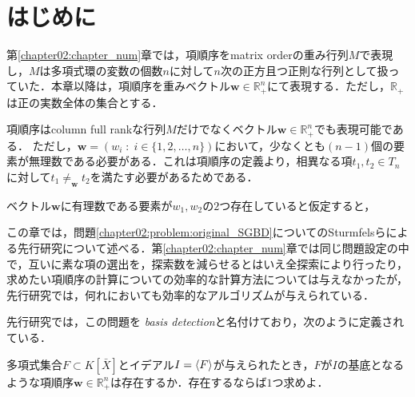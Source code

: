 \section{はじめに}
第\ref{chapter02:chapter_num}章では，項順序をmatrix orderの重み行列$M$で表現し，$M$は多項式環の変数の個数$n$に対して$n$次の正方且つ正則な行列として扱っていた．本章以降は，項順序を重みベクトル$\bm{w}\in \mathbb{R}^n_{+}$にて表現する．ただし，$\mathbb{R}_{+}$は正の実数全体の集合とする．
\begin{remark*}[ベクトルで表現された項順序について]
	項順序はcolumn full rankな行列$M$だけでなくベクトル$\bm{w}\in \mathbb{R}^n_{+}$でも表現可能である．
	ただし，$\bm{w} = (w_i\;:\; i\in \{1, 2, \dots, n\})$において，少なくとも$(n-1)$個の要素が無理数である必要がある．これは項順序の定義より，相異なる項$t_1, t_2 \in T_n$に対して$t_1 \ne_{\bm{w}} t_2$を満たす必要があるためである．
	\par
	ベクトル$\bm{w}$に有理数である要素が$w_1,w_2$の$2$つ存在していると仮定すると，

\end{remark*}
\par
この章では，問題\ref{chapter02:problem:original_SGBD}についてのSturmfelsらによる先行研究について述べる．第\ref{chapter02:chapter_num}章では同じ問題設定の中で，互いに素な項の選出を，探索数を減らせるとはいえ全探索により行ったり，求めたい項順序の計算についての効率的な計算方法については与えなかったが，先行研究では，何れにおいても効率的なアルゴリズムが与えられている．
\par
先行研究では，この問題を\emph{\groebner{} basis detection}と名付けており，次のように定義されている．
\begin{definition}
	多項式集合$F \subset K[\bar{X}]$とイデアル$I = \langle F \rangle$が与えられたとき，$F$が$I$の\groebner{}基底となるような項順序$\bm{w} \in \mathbb{R}^n_{+}$は存在するか．存在するならば$1$つ求めよ．
\end{definition}











